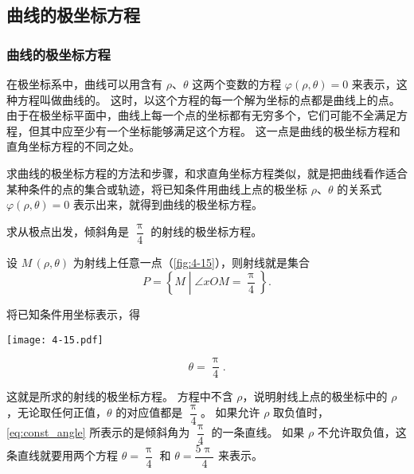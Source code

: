 \subsection{曲线的极坐标方程}\label{subsec:polar_equation}
\subsubsection{曲线的极坐标方程}
在极坐标系中，曲线可以用含有 $\rho$、$\theta$ 这两个变数的方程 $\varphi(\rho,\theta)=0$ 来表示，这种方程叫做曲线的。
这时，以这个方程的每一个解为坐标的点都是曲线上的点。
由于在极坐标平面中，曲线上每一个点的坐标都有无穷多个，它们可能不全满足方程，但其中应至少有一个坐标能够满足这个方程。
这一点是曲线的极坐标方程和直角坐标方程的不同之处。

求曲线的极坐标方程的方法和步骤，和求直角坐标方程类似，就是把曲线看作适合某种条件的点的集合或轨迹，将已知条件用曲线上点的极坐标 $\rho$、$\theta$ 的关系式 $\varphi(\rho,\theta)=0$ 表示出来，就得到曲线的极坐标方程。

\begin{example}
  求从极点出发，倾斜角是 $\dfrac{\uppi}{4}$ 的射线的极坐标方程。
\end{example}
\noindent
\begin{minipage}{0.6\linewidth}
\begin{solution}
  设 $M\,(\rho,\theta)$ 为射线上任意一点（\cref{fig:4-15}），则射线就是集合
  \[P=\left\{M \middle\vert \angle xOM=\frac{\uppi}{4}\right\}.\]

  将已知条件用坐标表示，得
\end{solution}
\end{minipage}\hfill
\begin{minipage}{0.35\linewidth}\centering
  \begin{figurehere}
    \texttt{[image: 4-15.pdf]}
    \caption{}\label{fig:4-15}
  \end{figurehere}
\end{minipage}
\begin{equation}
  \label{eq:const_angle}
  \theta=\frac{\uppi}{4}.
\end{equation}

这就是所求的射线的极坐标方程。
方程中不含 $\rho$，说明射线上点的极坐标中的 $\rho$，无论取任何正值，$\theta$ 的对应值都是 $\dfrac{\uppi}{4}$。
\medskip
如果允许 $\rho$ 取负值时，\cref{eq:const_angle} 所表示的是倾斜角为 $\dfrac{\uppi}{4}$ 的一条直线。
如果 $\rho$ 不允许取负值，这条直线就要用两个方程 $\theta=\dfrac{\uppi}{4}$ 和 $\theta=\dfrac{5\uppi}{4}$ 来表示。



